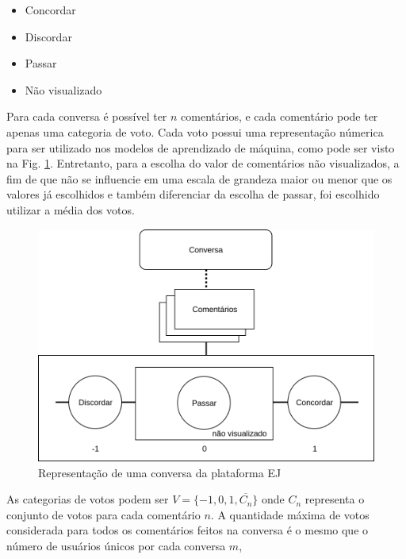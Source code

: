 \begin{itemize}
\item Concordar
\item Discordar
\item Passar
\item Não visualizado
\end{itemize}


Para cada conversa é possível ter $n$ comentários, e  cada comentário pode ter apenas uma categoria de voto.
Cada voto possui uma representação númerica para ser utilizado nos modelos de aprendizado de máquina, como pode ser visto na Fig. \ref{fig:fluxo-votos-comentarios}. Entretanto, para a escolha do valor de comentários não visualizados, a fim de que não se influencie em uma escala de grandeza maior ou menor que os valores já escolhidos e também diferenciar da escolha de passar, foi escolhido utilizar a média dos votos.





\begin{figure}[!h]
	\centering
	\includegraphics[keepaspectratio=true,scale=0.30]{figuras/tcc2/fluxograma_votos_comentarios.png}
	\caption{Representação de uma conversa da plataforma EJ}
	\label{fig:fluxo-votos-comentarios}
\end{figure}

As categorias de votos podem ser 
$V=\{-1, 0, 1, \overline{C_{n}}\}$
onde $C_{n}$ representa o conjunto de votos para cada comentário $n$.
A quantidade máxima de votos considerada para todos os comentários feitos na conversa é o mesmo que o número de usuários únicos por cada conversa $m$,

